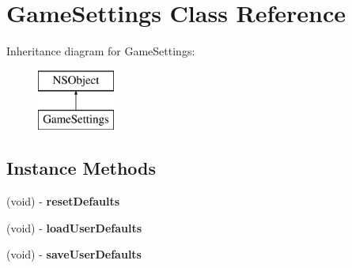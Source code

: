 \hypertarget{interface_game_settings}{\section{Game\+Settings Class Reference}
\label{interface_game_settings}
}
Inheritance diagram for Game\+Settings\+:\begin{figure}[H]
\begin{center}
\leavevmode
\includegraphics[height=2.000000cm]{interface_game_settings}
\end{center}
\end{figure}
\subsection*{Instance Methods}
\begin{DoxyCompactItemize}
\item 
\hypertarget{interface_game_settings_a50bb29b52dabe4f275e9758082189fbf}{(void) -\/ {\bfseries reset\+Defaults}}\label{interface_game_settings_a50bb29b52dabe4f275e9758082189fbf}

\item 
\hypertarget{interface_game_settings_a75a9177535614405dd026d997ba80c37}{(void) -\/ {\bfseries load\+User\+Defaults}}\label{interface_game_settings_a75a9177535614405dd026d997ba80c37}

\item 
\hypertarget{interface_game_settings_ae6bb2546dce1b78bb2b63f99b2086363}{(void) -\/ {\bfseries save\+User\+Defaults}}\label{interface_game_settings_ae6bb2546dce1b78bb2b63f99b2086363}

\end{DoxyCompactItemize}
